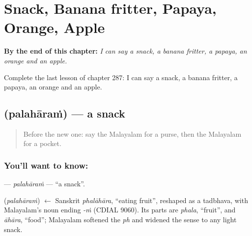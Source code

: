 
\chapter{Snack, Banana fritter, Papaya, Orange, Apple}
\label{ch:ml-snack-banana-fritter-papaya-orange-apple}

\begin{chapteropening}
\textbf{By the end of this chapter:} \emph{I can say a snack, a banana fritter, a papaya, an orange and an apple.}

Complete the last lesson of chapter 287: I can say a snack, a banana fritter, a papaya, an orange and an apple.
\end{chapteropening}

\section[\texorpdfstring{\ml{പലഹാരം} (palahāraṁ)}{പലഹാരം (palahāraṁ)}]{ (palahāraṁ) — a snack}

\label{lesson:ML-C287-palaharam}



\begin{quote}
Before the new one: say the Malayalam for a purse, then the Malayalam for a pocket.
\end{quote}

\subsection*{You'll want to know: }
\textbf{} — \emph{palahāraṁ} — \textquotedblleft{}a snack\textquotedblright{}.

\begin{cousinweb}
\textbf{} (\emph{palahāraṁ}) $\leftarrow$ Sanskrit \emph{phalāhāra}, \textquotedblleft{}eating fruit\textquotedblright{}, reshaped as a tadbhava, with Malayalam's noun ending \emph{-ṁ} (CDIAL 9060). Its parts are \emph{phala}, \textquotedblleft{}fruit\textquotedblright{}, and \emph{āhāra}, \textquotedblleft{}food\textquotedblright{}; Malayalam softened the \emph{ph} and widened the sense to any light snack.
\end{cousinweb}

